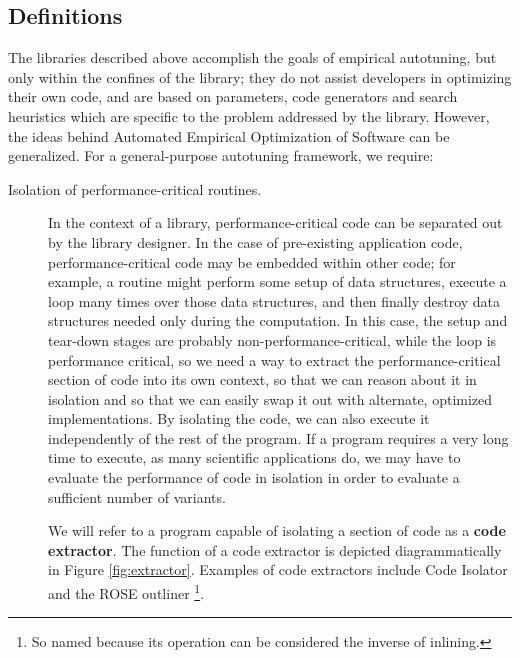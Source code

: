 \documentclass[msthesis,justified,copyright,final,numbers,sort&compress,
gsmodern,amstex,natbib]{uothesis}
\begin{document}
\subsection{Definitions}
\label{general:definitions}

The libraries described above accomplish the goals of empirical autotuning, but only within the confines of the library; they do not assist developers in optimizing their own code, and are based on parameters, code generators and search heuristics which are specific to the problem addressed by the library. However, the ideas behind Automated Empirical Optimization of Software \cite{empatlas} can be generalized. For a general-purpose autotuning framework, we require:

\begin{description}

\item[Isolation of performance-critical routines.]

In the context of a library, performance-critical code can be separated out by the library designer. In the case of pre-existing application code, performance-critical code may be embedded within other code; for example, a routine might perform some setup of data structures, execute a loop many times over those data structures, and then finally destroy data structures  needed only during the computation. In this case, the setup and tear-down stages are probably non-performance-critical, while the loop is performance critical, so we need a way to extract the performance-critical section of code into its own context, so that we can reason about it in isolation and so that we can easily swap it out with alternate, optimized implementations. By isolating the code, we can also execute it independently of the rest of the program. If a program requires a very long time to execute, as many scientific applications do, we may have to evaluate the performance of code in isolation in order to evaluate a sufficient number of variants.

We will refer to a program capable of isolating a section of code as a \textbf{code extractor}. The function of a code extractor is depicted diagrammatically in Figure \ref{fig:extractor}. Examples of code extractors include Code Isolator \cite{isolator} and the ROSE outliner \cite{outlining}\footnote[1]{So named because its operation can be considered the inverse of inlining.}.


\end{description}
\end{document}
